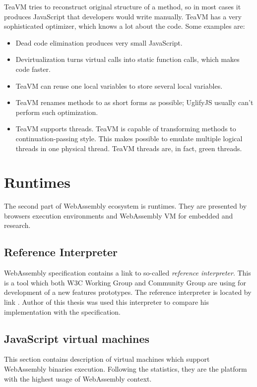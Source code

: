 TeaVM tries to reconstruct original structure of a method, so in most cases it produces JavaScript that developers would write manually.
TeaVM has a very sophisticated optimizer, which knows a lot about the code. Some examples are:
\begin{itemize}
\item Dead code elimination produces very small JavaScript.
\item Devirtualization turns virtual calls into static function calls, which makes code faster.
\item TeaVM can reuse one local variables to store several local variables.
\item TeaVM renames methods to as short forms as possible; UglifyJS usually can’t perform such optimization.
\item TeaVM supports threads. TeaVM is capable of transforming methods to continuation-passing style.
  This makes possible to emulate multiple logical threads in one physical thread. TeaVM threads are, in fact, green threads.
\end{itemize}

\section{Runtimes}

The second part of WebAssembly ecosystem is runtimes.
They are presented by browsers execution environments and WebAssembly VM for embedded and research. 

\subsection{Reference Interpreter} \mbox{}

WebAssembly specification contains a link to so-called \textit{reference interpreter}.
This is a tool which both W3C Working Group and Community Group are using for development of a new features prototypes.
The reference interpreter is located by link \cite{wasm_ref}.
Author of this thesis was used this interpreter to compare his implementation with the specification.

\subsection{JavaScript virtual machines} \mbox{}

This section contains description of virtual machines which support WebAssembly binaries execution.
Following the statistics, they are the platform with the highest usage of WebAssembly context.

